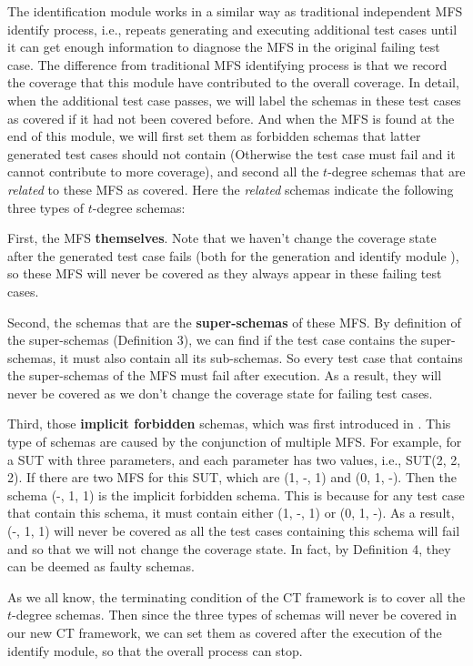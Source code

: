 \documentclass{sig-alternate}
\begin{document}
The identification module works in a similar way as traditional independent MFS identify process, i.e., repeats generating and executing additional test cases until it can get enough information to diagnose the MFS in the original failing test case. The difference from traditional MFS identifying process is that we record the coverage that this module have contributed to the overall coverage. In detail, when the additional test case passes, we will label the schemas in these test cases as covered if it had not been covered before. And when the MFS is found at the end of this module, we will first set them as forbidden schemas that latter generated test cases should not contain (Otherwise the test case must fail and it cannot contribute to more coverage), and second all the $t$-degree schemas that are \emph{related} to these MFS as covered. Here the \emph{related} schemas indicate the following three types of $t$-degree schemas:

First, the MFS \textbf{themselves}. Note that we haven't change the coverage state after the generated test case fails (both for the generation and identify module ), so these MFS will never be covered as they always appear in these failing test cases.

Second, the schemas that are the \textbf{super-schemas} of these MFS. By definition of the super-schemas (Definition 3), we can find if the test case contains the super-schemas, it must also contain all its sub-schemas. So every test case that contains the super-schemas of the MFS must fail after execution. As a result, they will never be covered as we don't change the coverage state for failing test cases.

Third, those \textbf{implicit forbidden} schemas, which was first introduced in \cite{cohen2007interaction}.  This type of schemas are caused by the conjunction of multiple MFS. For example, for a SUT with three parameters, and each parameter has two values, i.e., SUT(2, 2, 2). If there are two MFS for this SUT, which are (1, -, 1) and (0, 1, -). Then the schema (-, 1, 1) is the implicit forbidden schema. This is because for any test case that contain this schema, it must contain either (1, -, 1) or (0, 1, -). As a result, (-, 1, 1) will never be covered as all the test cases containing this schema will fail and so that we will not change the coverage state. In fact, by Definition 4, they can be deemed as faulty schemas.

As we all know, the terminating condition of the CT framework is to cover all the $t$-degree schemas. Then since the three types of schemas will never be covered in our new CT framework, we can set them as covered after the execution of the identify module, so that the overall process can stop.
\end{document}
